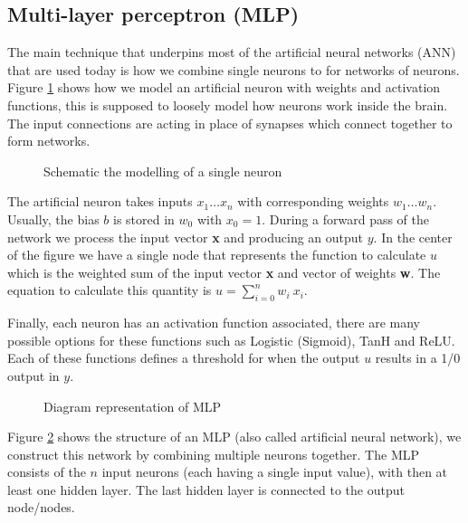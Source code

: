\subsection{Multi-layer perceptron (MLP)}
\label{dsgn:sec:dl:mlp}
The main technique that underpins most of the artificial neural networks (ANN) that are used today is how we combine single neurons to for networks of neurons. Figure \ref{fig:neuron} shows how we model an artificial neuron with weights and activation functions, this is supposed to loosely model how neurons work inside the brain. The input connections are acting in place of synapses which connect together to form networks.

\begin{figure}[ht!]
	\centering
	\caption{Schematic the modelling of a single neuron} \label{fig:neuron}
\end{figure}

The artificial neuron takes inputs $x_1 \hdots x_n$ with corresponding weights $w_1 \hdots w_n$. Usually, the bias $b$ is stored in $w_0$ with $x_0 = 1$. During a forward pass of the network we process the input vector \textbf{x} and producing an output $y$. In the center of the figure we have a single node that represents the function to calculate $u$ which is the weighted sum of the input vector \textbf{x} and vector of weights \textbf{w}. The equation to calculate this quantity is $u = \sum_{i=0}^n w_i~x_i$.

Finally, each neuron has an activation function associated, there are many possible options for these functions such as Logistic (Sigmoid), TanH and ReLU. Each of these functions defines a threshold for when the output $u$ results in a 1/0 output in $y$.

\begin{figure}[ht!]
	\centering
	\caption{Diagram representation of MLP} \label{fig:mlp}
\end{figure}

Figure \ref{fig:mlp} shows the structure of an MLP (also called artificial neural network), we construct this network by combining multiple neurons together. The MLP consists of the $n$ input neurons (each having a single input value), with then at least one hidden layer. The last hidden layer is connected to the output node/nodes.

